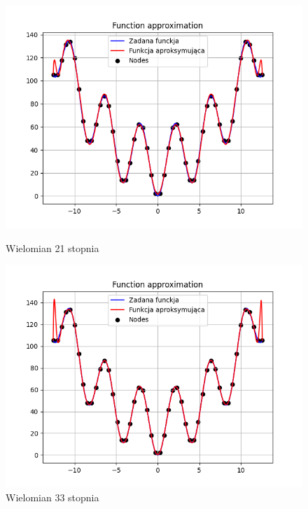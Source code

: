 \documentclass{article}
\begin{document}
\begin{figure}[H]
  \begin{minipage}[b]{0.49\textwidth}
    \begin{minipage}[b]{\textwidth}
      \includegraphics[width=\textwidth]{img18.png}
      \caption{Wielomian 21 stopnia}
    \end{minipage}
    \vspace*{\fill}
    \begin{minipage}[b]{\textwidth}
      \includegraphics[width=\textwidth]{img19.png}
      \caption{Wielomian 33 stopnia}
    \end{minipage}
  \end{minipage}
  \hfill
  \begin{minipage}[b]{0.49\textwidth}

\end{minipage}
\end{figure}
\end{document}
